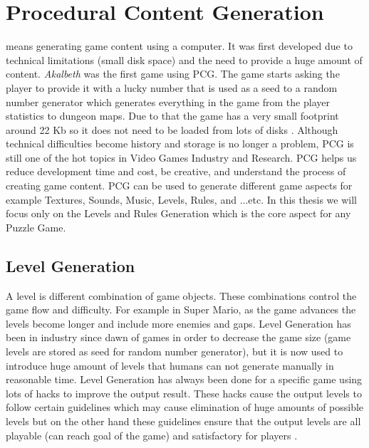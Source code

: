 \section{Procedural Content Generation}
 means generating game content using a computer. It was first developed due to technical limitations (small disk space) and the need to provide a huge amount of content. \emph{Akalbeth} was the first game using PCG. The game starts asking the player to provide it with a lucky number that is used as a seed to a random number generator which generates everything in the game from the player statistics to dungeon maps. Due to that the game has a very small footprint around 22 Kb so it does not need to be loaded from lots of disks \cite{pcgFirstGame}. Although technical difficulties become history and storage is no longer a problem, PCG is still one of the hot topics in Video Games Industry and Research. PCG helps us reduce development time and cost, be creative, and understand the process of creating game content. PCG can be used to generate different game aspects for example Textures, Sounds, Music, Levels, Rules, and ...etc. In this thesis we will focus only on the Levels and Rules Generation which is the core aspect for any Puzzle Game.

\subsection{Level Generation}
A level is different combination of game objects. These combinations control the game flow and difficulty. For example in Super Mario, as the game advances the levels become longer and include more enemies and gaps. Level Generation has been in industry since dawn of games in order to decrease the game size (game levels are stored as seed for random number generator), but it is now used to introduce huge amount of levels that humans can not generate manually in reasonable time. Level Generation has always been done for a specific game using lots of hacks to improve the output result. These hacks cause the output levels to follow certain guidelines which may cause elimination of huge amounts of possible levels but on the other hand these guidelines ensure that the output levels are all playable (can reach goal of the game) and satisfactory for players \cite{mcGenerateEverything}.

